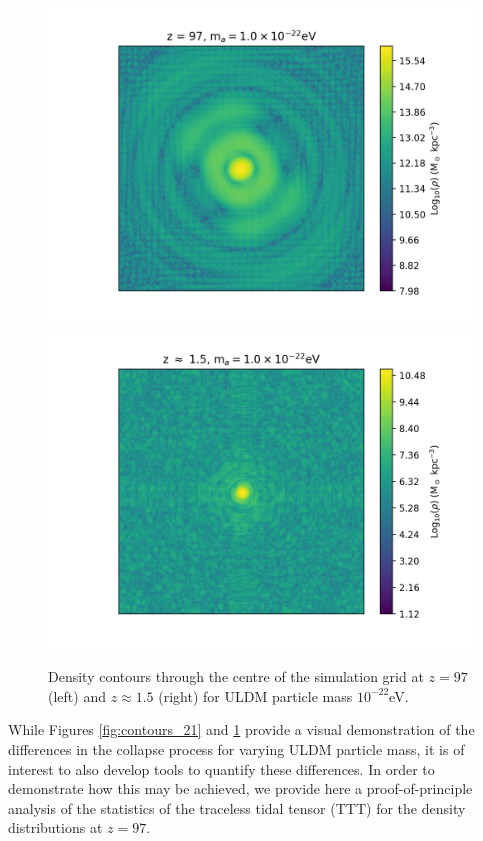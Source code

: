 \documentclass[a4paper,11pt]{article}
\begin{document}
\begin{figure}[!htb]
  \includegraphics[trim={3cm 0 0 0}, scale=0.62]{z97_1e-22.png}
\endminipage\hfill
{}
  \includegraphics[trim={2cm 0 1cm 0},scale=0.62]{final_22.png}
\endminipage\hfill
\caption{Density contours through the centre of the simulation grid at $z=97$ (left) and $z\approx 1.5$ (right) for ULDM particle mass $10^{-22}$eV.}\label{fig:contours_22}
\end{figure}

While Figures \ref{fig:contours_21} and \ref{fig:contours_22} provide a visual demonstration of the differences in the collapse process for varying ULDM particle mass, it is of interest to also develop tools to quantify these differences. In order to demonstrate how this may be achieved, we provide here a proof-of-principle analysis of the statistics of the traceless tidal tensor (TTT) for the density distributions at $z=97$.
\end{document}

